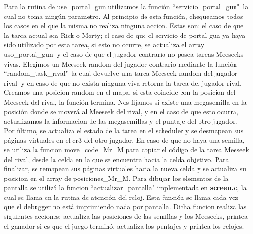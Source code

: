 \documentclass[a4paper]{article}
\begin{document}
\justify
Para la rutina de use_portal_gun utilizamos la función ``servicio_portal_gun"\, la cual no toma ningún parametro. Al principio de esta función, chequeamos todos los casos en el que la misma no realiza ninguna accion. Estas son: el caso de que la tarea actual sea Rick o Morty; el caso de que el servicio de portal gun ya haya sido utilizado por esta tarea, si esto no ocurre, se actualiza el array uso_portal_gun; y el caso de que el jugador contrario no posea tareas Meeseeks vivas. Elegimos un Meeseek random del jugador contrario mediante la función ``random_task_rival"\, la cual devuelve una tarea Meeseek random del jugador rival, y en caso de que no exista ninguna viva retorna la tarea del jugador rival. Creamos una posicion random en el mapa, si esta coincide con la posicion del Meeseek del rival, la función termina. Nos fijamos si existe una megasemilla en la posición donde se moverá al Meeseek del rival, y en el caso de que esto ocurra, actualizamos la informacion de las megasemillas y el puntaje del otro jugador. Por último, se actualiza el estado de la tarea en el scheduler y se desmapean sus páginas virtuales en el cr3 del otro jugador. En caso de que no haya una semilla, se utiliza la funcion move_code_Mr_M para copiar el código de la tarea Meeseek del rival, desde la celda en la que se encuentra hacia la celda objetivo. Para finalizar, se remapean sus páginas virtuales hacia la nueva celda y se actualiza su posicion en el array de posiciones_Mr_M.
\justify
Para dibujar los elementos de la pantalla se utilizó la funcion ``actualizar_pantalla" implementada en \textbf{screen.c}, la cual se llama en la rutina de atención del reloj. Esta función se llama cada vez que el debugger no está imprimiendo nada por pantalla. Dicha funcion realiza las siguientes acciones: actualiza las posiciones de las semillas y los Meeseeks, printea el ganador si es que el juego terminó, actualiza los puntajes y printea los relojes.
\end{document}
